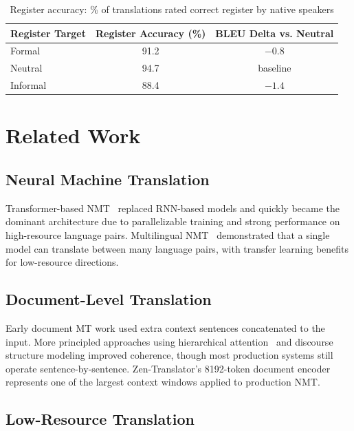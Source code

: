 \documentclass[11pt,a4paper]{article}
\begin{document}
\begin{table}[H]
\centering
\caption{Register accuracy: \% of translations rated correct register by native speakers}
\begin{tabular}{lcc}
\toprule
\textbf{Register Target} & \textbf{Register Accuracy (\%)} & \textbf{BLEU Delta vs. Neutral} \\
\midrule
Formal     & 91.2 & $-0.8$ \\
Neutral    & 94.7 & baseline \\
Informal   & 88.4 & $-1.4$ \\
\bottomrule
\end{tabular}
\label{tab:register}
\end{table}

\section{Related Work}
\label{sec:related}

\subsection{Neural Machine Translation}

Transformer-based NMT~\cite{vaswani2017attention} replaced RNN-based models and
quickly became the dominant architecture due to parallelizable training and strong
performance on high-resource language pairs. Multilingual NMT~\cite{aharoni2019massively}
demonstrated that a single model can translate between many language pairs, with
transfer learning benefits for low-resource directions.

\subsection{Document-Level Translation}

Early document MT work used extra context sentences concatenated to the input.
More principled approaches using hierarchical attention~\cite{docmt} and discourse
structure modeling improved coherence, though most production systems still operate
sentence-by-sentence. Zen-Translator's 8192-token document encoder represents one
of the largest context windows applied to production NMT.

\subsection{Low-Resource Translation}
\end{document}
